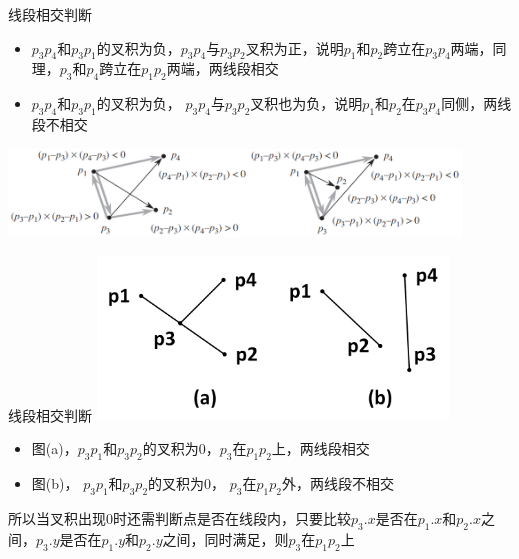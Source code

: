 \begin{frame}{线段相交判断}
    \begin{itemize}
        \item $p_3p_4$和$p_3p_1$的叉积为负，$p_3p_4$与$p_3p_2$叉积为正，说明$p_1$和$p_2$跨立在$p_3p_4$两端，同理，$p_3$和$p_4$跨立在$p_1p_2$两端，两线段相交
        \item $p_3p_4$和$p_3p_1$的叉积为负， $p_3p_4$与$p_3p_2$叉积也为负，说明$p_1$和$p_2$在$p_3p_4$同侧，两线段不相交
    \end{itemize}  
    \vfill
    \includegraphics[width=0.9\textwidth,center]{fig/9-2.png}
\end{frame}
\begin{frame}{线段相交判断}
    \includegraphics[width=0.7\textwidth,center]{fig/9-3.png}
    \begin{itemize}
        \item 图(a)，$p_3p_1$和$p_3p_2$的叉积为0，$p_3$在$p_1p_2$上，两线段相交
        \item 图(b)， $p_3p_1$和$p_3p_2$的叉积为0， $p_3$在$p_1p_2$外，两线段不相交
    \end{itemize}  
    \vfill
    所以当叉积出现0时还需判断点是否在线段内，只要比较$p_3.x$是否在$p_1.x$和$p_2.x$之间，$p_3.y$是否在$p_1.y$和$p_2.y$之间，同时满足，则$p_3$在$p_1p_2$上
\end{frame}
